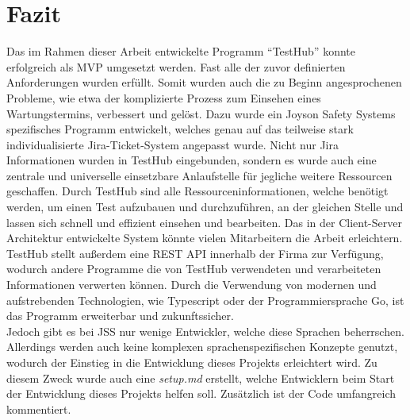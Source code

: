 \section{Fazit}

Das im Rahmen dieser Arbeit entwickelte Programm ``TestHub'' konnte erfolgreich 
als \gls{MVP} umgesetzt werden. Fast alle der zuvor definierten Anforderungen wurden
erfüllt. Somit wurden auch die zu Beginn angesprochenen Probleme, wie etwa der 
komplizierte Prozess zum Einsehen eines Wartungstermins, verbessert und gelöst.
Dazu wurde ein Joyson Safety Systems spezifisches Programm entwickelt, welches
genau auf das teilweise stark individualisierte Jira-Ticket-System angepasst wurde. 
Nicht nur \gls{Jira} Informationen wurden in TestHub eingebunden, sondern es wurde auch 
eine zentrale und universelle einsetzbare Anlaufstelle für jegliche weitere 
Ressourcen geschaffen. Durch TestHub sind alle Ressourceninformationen, welche
benötigt werden, um einen Test aufzubauen und durchzuführen, an der gleichen Stelle 
und lassen sich schnell und effizient einsehen und bearbeiten. Das in der 
Client-Server Architektur entwickelte System könnte vielen Mitarbeitern
die Arbeit erleichtern. TestHub stellt außerdem eine \gls{REST} \gls{API} innerhalb der Firma 
zur Verfügung, wodurch andere Programme die von TestHub verwendeten und verarbeiteten 
Informationen verwerten können. Durch die Verwendung von modernen und aufstrebenden Technologien,
wie Typescript oder der Programmiersprache Go, ist das Programm erweiterbar 
und zukunftssicher.\\

Jedoch gibt es bei \gls{JSS} nur wenige Entwickler, welche diese Sprachen beherrschen.
Allerdings werden auch keine komplexen sprachenspezifischen Konzepte genutzt, wodurch
der Einstieg in die Entwicklung dieses Projekts erleichtert wird. Zu diesem Zweck
wurde auch eine \textit{setup.md} erstellt, welche Entwicklern beim Start der
Entwicklung dieses Projekts helfen soll. Zusätzlich ist der Code umfangreich kommentiert.

